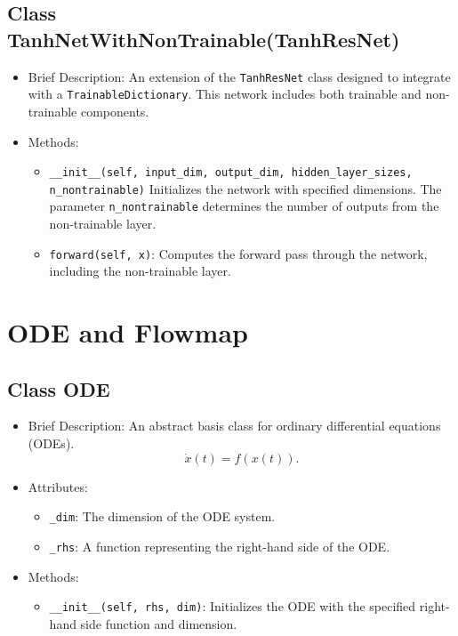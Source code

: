 \subsection{Class TanhNetWithNonTrainable(TanhResNet)}

\begin{itemize}
\item Brief Description: 
  An extension of the \lstinline|TanhResNet| class designed to 
  integrate with a \lstinline|TrainableDictionary|. 
  This network includes both trainable and non-trainable components.
\item Methods:
  \begin{itemize}
  \item \lstinline|__init__(self, input_dim, output_dim, hidden_layer_sizes, n_nontrainable)|
    Initializes the network with specified dimensions. 
    The parameter \lstinline|n_nontrainable| determines the number of outputs 
    from the non-trainable layer.
  \item \lstinline|forward(self, x)|: Computes the forward pass through the network, 
    including the non-trainable layer.
  \end{itemize}
\end{itemize}

\section{ODE and Flowmap}

\subsection{Class ODE}

\begin{itemize}
\item Brief Description: An abstract basis class for ordinary
  differential equations (ODEs).
  \begin{equation*}
    \dot{x}(t) = f(x(t)).
  \end{equation*}
\item Attributes:
  \begin{itemize}
  \item \lstinline|_dim|: The dimension of the ODE system.
  \item \lstinline|_rhs|: A function representing the right-hand side of the ODE.
  \end{itemize}
\item Methods:
  \begin{itemize}
  \item \lstinline|__init__(self, rhs, dim)|: Initializes the ODE 
    with the specified right-hand side function and dimension.
  \end{itemize}
\end{itemize}

